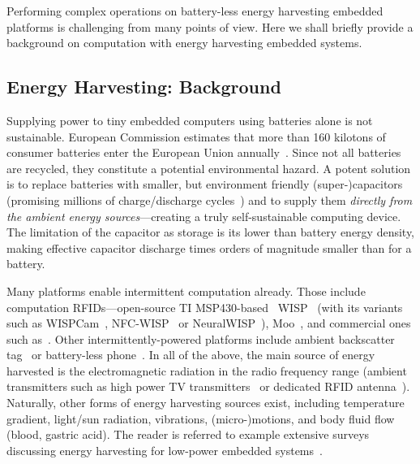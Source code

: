 Performing complex operations on battery-less energy harvesting embedded platforms is challenging from many points of view. Here we shall briefly provide a background on computation with energy harvesting embedded systems. 

\subsection{Energy Harvesting: Background}

Supplying power to tiny embedded computers using batteries alone is not sustainable. European Commission estimates that more than 160 kilotons of consumer batteries enter the European Union annually~\cite{eu_batteries_2016}. Since not all batteries are recycled, they constitute a potential environmental hazard. A potent solution is to replace batteries with smaller, but environment friendly {(super-)capacitors} (promising millions of charge/discharge cycles~\cite[Sec. I]{ongaro_pwre_2012}) and to supply them {\em directly from the ambient energy sources}---creating a truly self-sustainable computing device. The limitation of the capacitor as storage is its lower than battery energy density, making effective capacitor discharge times orders of magnitude smaller than for a battery.

Many platforms enable intermittent computation already. Those include computation RFIDs---open-source TI MSP430-based~\cite{wolverine} WISP~\cite{wisp5} (with its variants such as WISPCam~\cite{naderiparizi_rfid_2015}, NFC-WISP~\cite{zhao_rfid_2015} or NeuralWISP~\cite{holleman_biocas_2008}), Moo~\cite{moo}, and commercial ones such as~\cite{medusa_farsens_2017}. Other intermittently-powered platforms include ambient backscatter tag~\cite{liu_sigcomm_2013,parks_sigcomm_2014} or battery-less phone~\cite{talla_imwut_2017}. In all of the above, the main source of energy harvested is the electromagnetic radiation in the radio frequency range (ambient transmitters such as high power TV transmitters~\cite{liu_sigcomm_2013} or dedicated RFID antenna~\cite{wisp5,moo,talla_imwut_2017,medusa_farsens_2017,holleman_biocas_2008,naderiparizi_rfid_2015}). Naturally, other forms of energy harvesting sources exist, including temperature gradient, light/sun radiation, vibrations, (micro-)motions, and body fluid flow (blood, gastric acid). The reader is referred to example extensive surveys discussing energy harvesting for low-power embedded systems~\cite{paradiso_pvc_2005,soyata_csm_2016,prasad_comst_2014,ku_cst_2016}.

